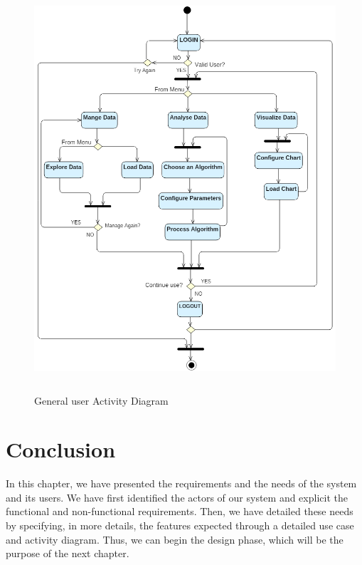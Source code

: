 \begin{figure}[H]
\begin{center}
\includegraphics[width=17cm,height=15cm]{chapter3/activity.png}
\end{center}
\caption{General user Activity Diagram}
\label{act3}
\end{figure}




 
\section*{Conclusion}

In this chapter, we have presented the requirements and the needs of the system and its users. We have first identified the actors of our system and explicit the functional and non-functional requirements. Then, we have detailed these needs by specifying, in more details, the features expected through a detailed use case and activity diagram. Thus, we can begin the design phase, which will be the purpose of the next chapter.
